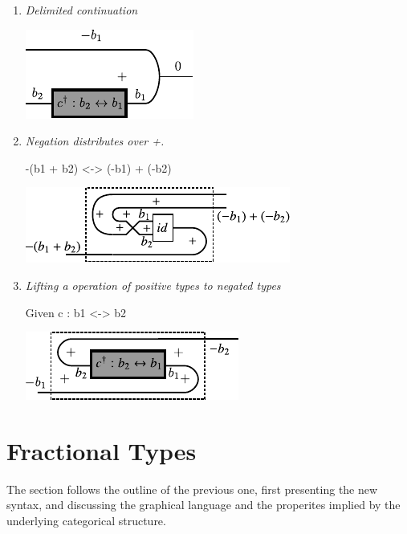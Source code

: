 \documentclass[preprint]{sigplanconf}
\begin{document}
\begin{enumerate}
\item
\emph{Delimited continuation}

\begin{center}
  \includegraphics{diagrams/delimc.pdf}
\end{center}

\item
\emph{Negation distributes over {{+}}. }

{{-(b1 + b2) <-> (-b1) + (-b2)}}

\begin{center}
  \includegraphics{diagrams/dist_neg_plus.pdf}
\end{center}

\item
\emph{Lifting a operation of positive types to negated types}

Given {{c : b1 <-> b2}}

\begin{center}
  \includegraphics{diagrams/neg_lift.pdf}
\end{center}

\end{enumerate}


\section{Fractional Types}
\label{sec:frac}

The section follows the outline of the previous one, first presenting the new
syntax, and discussing the graphical language and the properites implied by
the underlying categorical structure.
\end{document}
